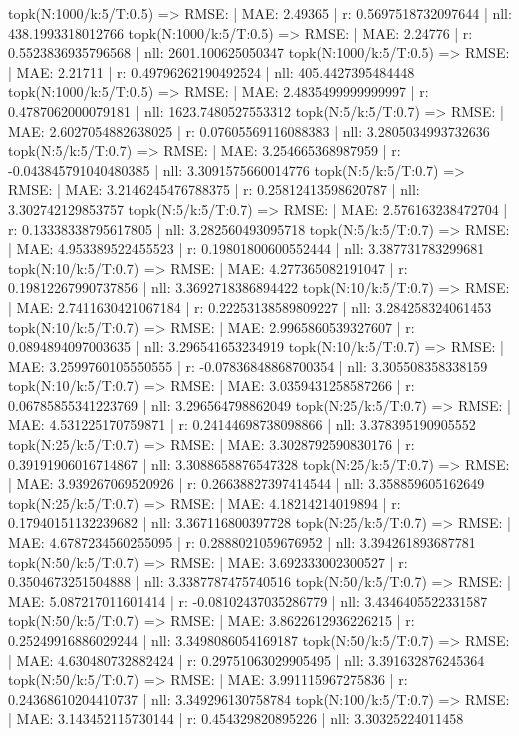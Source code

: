topk(N:1000/k:5/T:0.5) => RMSE: | MAE: 2.49365 | r: 0.5697518732097644 | nll: 438.1993318012766
topk(N:1000/k:5/T:0.5) => RMSE: | MAE: 2.24776 | r: 0.5523836935796568 | nll: 2601.100625050347
topk(N:1000/k:5/T:0.5) => RMSE: | MAE: 2.21711 | r: 0.49796262190492524 | nll: 405.4427395484448
topk(N:1000/k:5/T:0.5) => RMSE: | MAE: 2.4835499999999997 | r: 0.4787062000079181 | nll: 1623.7480527553312
topk(N:5/k:5/T:0.7) => RMSE: | MAE: 2.6027054882638025 | r: 0.07605569116088383 | nll: 3.2805034993732636
topk(N:5/k:5/T:0.7) => RMSE: | MAE: 3.254665368987959 | r: -0.043845791040480385 | nll: 3.3091575660014776
topk(N:5/k:5/T:0.7) => RMSE: | MAE: 3.2146245476788375 | r: 0.25812413598620787 | nll: 3.302742129853757
topk(N:5/k:5/T:0.7) => RMSE: | MAE: 2.576163238472704 | r: 0.13338338795617805 | nll: 3.282560493095718
topk(N:5/k:5/T:0.7) => RMSE: | MAE: 4.953389522455523 | r: 0.19801800600552444 | nll: 3.387731783299681
topk(N:10/k:5/T:0.7) => RMSE: | MAE: 4.277365082191047 | r: 0.19812267990737856 | nll: 3.3692718386894422
topk(N:10/k:5/T:0.7) => RMSE: | MAE: 2.7411630421067184 | r: 0.22253138589809227 | nll: 3.284258324061453
topk(N:10/k:5/T:0.7) => RMSE: | MAE: 2.9965860539327607 | r: 0.0894894097003635 | nll: 3.296541653234919
topk(N:10/k:5/T:0.7) => RMSE: | MAE: 3.2599760105550555 | r: -0.07836848868700354 | nll: 3.305508358338159
topk(N:10/k:5/T:0.7) => RMSE: | MAE: 3.0359431258587266 | r: 0.06785855341223769 | nll: 3.296564798862049
topk(N:25/k:5/T:0.7) => RMSE: | MAE: 4.531225170759871 | r: 0.24144698738098866 | nll: 3.378395190905552
topk(N:25/k:5/T:0.7) => RMSE: | MAE: 3.3028792590830176 | r: 0.39191906016714867 | nll: 3.3088658876547328
topk(N:25/k:5/T:0.7) => RMSE: | MAE: 3.939267069520926 | r: 0.26638827397414544 | nll: 3.358859605162649
topk(N:25/k:5/T:0.7) => RMSE: | MAE: 4.18214214019894 | r: 0.17940151132239682 | nll: 3.367116800397728
topk(N:25/k:5/T:0.7) => RMSE: | MAE: 4.6787234560255095 | r: 0.2888021059676952 | nll: 3.394261893687781
topk(N:50/k:5/T:0.7) => RMSE: | MAE: 3.692333002300527 | r: 0.3504673251504888 | nll: 3.3387787475740516
topk(N:50/k:5/T:0.7) => RMSE: | MAE: 5.087217011601414 | r: -0.08102437035286779 | nll: 3.4346405522331587
topk(N:50/k:5/T:0.7) => RMSE: | MAE: 3.8622612936226215 | r: 0.25249916886029244 | nll: 3.3498086054169187
topk(N:50/k:5/T:0.7) => RMSE: | MAE: 4.630480732882424 | r: 0.29751063029905495 | nll: 3.391632876245364
topk(N:50/k:5/T:0.7) => RMSE: | MAE: 3.991115967275836 | r: 0.24368610204410737 | nll: 3.349296130758784
topk(N:100/k:5/T:0.7) => RMSE: | MAE: 3.143452115730144 | r: 0.454329820895226 | nll: 3.30325224011458
